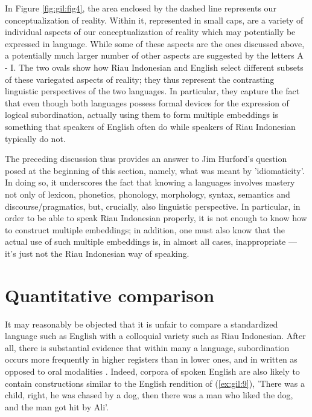 \documentclass[output=paper,colorlinks,citecolor=brown
]{langscibook}
\begin{document}
In Figure \ref{fig:gil:fig4}, the area enclosed by the dashed line represents our conceptualization of reality.  Within it, represented in small caps, are a variety of individual aspects of our conceptualization of reality which may potentially be expressed in language.  While some of these aspects are the ones discussed above, a potentially much larger number of other aspects are suggested by the letters A - I.  The two ovals show how Riau Indonesian and English select different subsets of these variegated aspects of reality; they thus represent the contrasting linguistic perspectives of the two languages.  In particular, they capture the fact that even though both languages possess formal devices for the expression of logical subordination, actually using them to form multiple embeddings is something that speakers of English often do while speakers of Riau Indonesian typically do not.

The preceding discussion thus provides an answer to Jim Hurford's question posed at the beginning of this section, namely, what was meant by 'idiomaticity'.  In doing so, it underscores the fact that knowing a languages involves mastery not only of lexicon, phonetics, phonology, morphology, syntax, semantics and discourse/pragmatics, but, crucially, also linguistic perspective.  In particular, in order to be able to speak Riau Indonesian properly, it is not enough to know how to construct multiple embeddings; in addition, one must also know that the actual use of such multiple embeddings is, in almost all cases, inappropriate — it's just not the Riau Indonesian way of speaking.

\section{Quantitative comparison}
It may reasonably be objected that it is unfair to compare a standardized language such as English with a colloquial variety such as Riau Indonesian.  After all, there is substantial evidence that within many a language, subordination occurs more frequently in higher registers than in lower ones, and in written as opposed to oral modalities \citep[and others]{givon1979understanding,deutscher2000syntactic,karlsson2009aorigin,karlsson2009bsyntactic}. Indeed, corpora of spoken English are also likely to contain constructions similar to the English rendition of (\ref{ex:gil:9}), 'There was a child, right, he was chased by a dog, then there was a man who liked the dog, and the man got hit by Ali'. 
\end{document}
